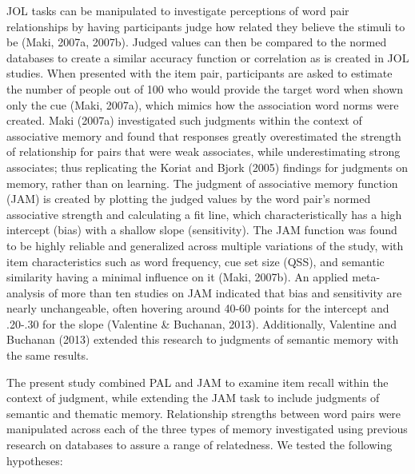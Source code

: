 \documentclass[english,man]{apa6}
\theoremstyle{definition}
\theoremstyle{definition}
\theoremstyle{definition}
\theoremstyle{remark}
\begin{document}
JOL tasks can be manipulated to investigate perceptions of word pair
relationships by having participants judge how related they believe the
stimuli to be (Maki, 2007a, 2007b). Judged values can then be compared
to the normed databases to create a similar accuracy function or
correlation as is created in JOL studies. When presented with the item
pair, participants are asked to estimate the number of people out of 100
who would provide the target word when shown only the cue (Maki, 2007a),
which mimics how the association word norms were created. Maki (2007a)
investigated such judgments within the context of associative memory and
found that responses greatly overestimated the strength of relationship
for pairs that were weak associates, while underestimating strong
associates; thus replicating the Koriat and Bjork (2005) findings for
judgments on memory, rather than on learning. The judgment of
associative memory function (JAM) is created by plotting the judged
values by the word pair's normed associative strength and calculating a
fit line, which characteristically has a high intercept (bias) with a
shallow slope (sensitivity). The JAM function was found to be highly
reliable and generalized across multiple variations of the study, with
item characteristics such as word frequency, cue set size (QSS), and
semantic similarity having a minimal influence on it (Maki, 2007b). An
applied meta-analysis of more than ten studies on JAM indicated that
bias and sensitivity are nearly unchangeable, often hovering around
40-60 points for the intercept and .20-.30 for the slope (Valentine \&
Buchanan, 2013). Additionally, Valentine and Buchanan (2013) extended
this research to judgments of semantic memory with the same results.

The present study combined PAL and JAM to examine item recall within the
context of judgment, while extending the JAM task to include judgments
of semantic and thematic memory. Relationship strengths between word
pairs were manipulated across each of the three types of memory
investigated using previous research on databases to assure a range of
relatedness. We tested the following hypotheses:
\end{document}
